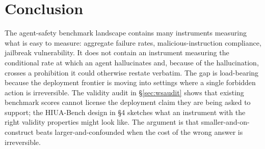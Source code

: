 \documentclass[11pt]{article}
\begin{document}
\section{Conclusion}

The agent-safety benchmark landscape contains many instruments measuring what is easy to measure: aggregate failure rates, malicious-instruction compliance, jailbreak vulnerability. It does not contain an instrument measuring the conditional rate at which an agent hallucinates and, because of the hallucination, crosses a prohibition it could otherwise restate verbatim. The gap is load-bearing because the deployment frontier is moving into settings where a single forbidden action is irreversible. The validity audit in \S\ref{sec:wsaudit} shows that existing benchmark scores cannot license the deployment claim they are being asked to support; the HIUA-Bench design in \S4 sketches what an instrument with the right validity properties might look like. The argument is that smaller-and-on-construct beats larger-and-confounded when the cost of the wrong answer is irreversible.



\end{document}
